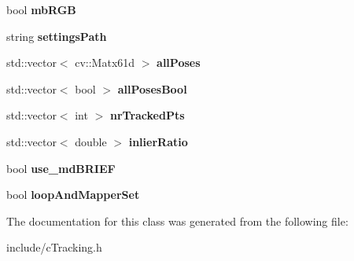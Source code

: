 \begin{DoxyCompactItemize}
\item 
bool {\bfseries mb\+R\+GB}\hypertarget{classMultiColSLAM_1_1cTracking_a8c3df4348e78241b439f811370de8a28}{}\label{classMultiColSLAM_1_1cTracking_a8c3df4348e78241b439f811370de8a28}

\item 
string {\bfseries settings\+Path}\hypertarget{classMultiColSLAM_1_1cTracking_a7399a1830f6fef66802eae6ae1f8622d}{}\label{classMultiColSLAM_1_1cTracking_a7399a1830f6fef66802eae6ae1f8622d}

\item 
std\+::vector$<$ cv\+::\+Matx61d $>$ {\bfseries all\+Poses}\hypertarget{classMultiColSLAM_1_1cTracking_ae372e3a255b75d2b32924881316d2937}{}\label{classMultiColSLAM_1_1cTracking_ae372e3a255b75d2b32924881316d2937}

\item 
std\+::vector$<$ bool $>$ {\bfseries all\+Poses\+Bool}\hypertarget{classMultiColSLAM_1_1cTracking_a502795260ba28f588dd997a4e484da87}{}\label{classMultiColSLAM_1_1cTracking_a502795260ba28f588dd997a4e484da87}

\item 
std\+::vector$<$ int $>$ {\bfseries nr\+Tracked\+Pts}\hypertarget{classMultiColSLAM_1_1cTracking_a8ebb082ee3aaba8fbe4b774509940590}{}\label{classMultiColSLAM_1_1cTracking_a8ebb082ee3aaba8fbe4b774509940590}

\item 
std\+::vector$<$ double $>$ {\bfseries inlier\+Ratio}\hypertarget{classMultiColSLAM_1_1cTracking_a1c1c2e2590671cf31a988e64ec40388e}{}\label{classMultiColSLAM_1_1cTracking_a1c1c2e2590671cf31a988e64ec40388e}

\item 
bool {\bfseries use\+\_\+md\+B\+R\+I\+EF}\hypertarget{classMultiColSLAM_1_1cTracking_a15b19b7c0a5fc13b18b88bad22c44bf5}{}\label{classMultiColSLAM_1_1cTracking_a15b19b7c0a5fc13b18b88bad22c44bf5}

\item 
bool {\bfseries loop\+And\+Mapper\+Set}\hypertarget{classMultiColSLAM_1_1cTracking_a553dda2d3ff91cf91b62d5d94c029729}{}\label{classMultiColSLAM_1_1cTracking_a553dda2d3ff91cf91b62d5d94c029729}

\end{DoxyCompactItemize}


The documentation for this class was generated from the following file\+:\begin{DoxyCompactItemize}
\item 
include/c\+Tracking.\+h\end{DoxyCompactItemize}
